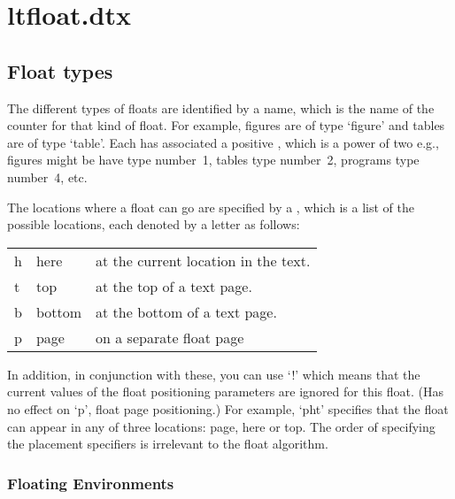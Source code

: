 \chapter{ltfloat.dtx}

 \section{Float types}

  The different types of floats are identified by a  name,
  which is the name of the counter for that kind of float.  For
  example, figures are of type `figure' and tables are of type `table'.
  Each  has associated a positive , which
  is a power of two e.g.,\\
  figures might be have type number~1, tables type number~2, programs
  type number~4, etc.

  The locations where a float can go are specified by a
  , which is a list of the possible
  locations, each denoted by a letter as follows:

    \begin{center}
    \begin{tabular}{l@{ : }l@{ --- }l}
     h & here   & at the current location in the text.\\
     t & top    & at the top of a text page.\\
     b & bottom & at the bottom of a text page.\\
     p & page   & on a separate float page
    \end{tabular}
    \end{center}

  In addition, in conjunction with these, you can use `!' which means
  that the current values of the float positioning parameters are
  ignored for this float. (Has no effect on `p', float page
  positioning.)
  For example, `pht' specifies that the float can appear in any of
  three locations: page, here or top. The order of specifying the placement
  specifiers is irrelevant to the float algorithm.


\subsection{Floating Environments}
    \begin{teX}
    \end{teX}

